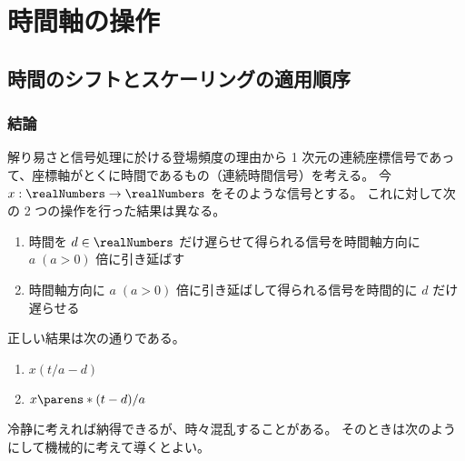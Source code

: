 \part{時間軸の操作}
    \chapter{時間のシフトとスケーリングの適用順序}
        \section{結論}
            \label{時間のシフトとスケーリングの適用順序.結論}
            解り易さと信号処理に於ける登場頻度の理由から 1 次元の連続座標信号であって、座標軸がとくに時間であるもの（連続時間信号）を考える。
            今 $x:\realNumbers\to\realNumbers$ をそのような信号とする。
            これに対して次の 2 つの操作を行った結果は異なる。
            \begin{enumerate}
                \item 時間を $d\in\realNumbers$ だけ遅らせて得られる信号を時間軸方向に $a\;(a>0)$ 倍に引き延ばす
                \item 時間軸方向に $a\;(a>0)$ 倍に引き延ばして得られる信号を時間的に $d$ だけ遅らせる
            \end{enumerate}
            正しい結果は次の通りである。
            \begin{enumerate}
                \item $x(t/a-d)$
                \item $x\parens*{(t-d)/a}$
            \end{enumerate}
            冷静に考えれば納得できるが、時々混乱することがある。
            そのときは次のようにして機械的に考えて導くとよい。
